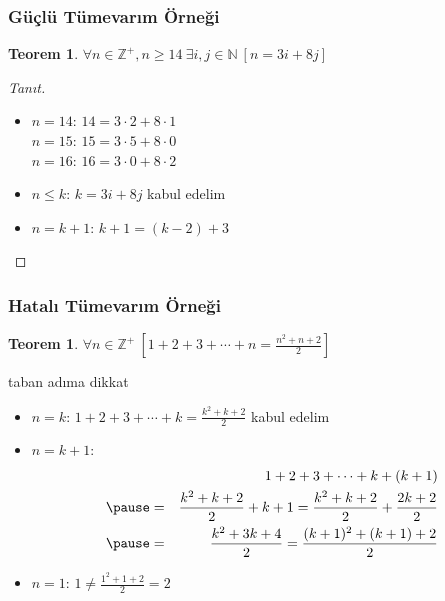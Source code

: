 \documentclass[dvipsnames]{beamer}
\theoremstyle{definition}
\theoremstyle{example}
\theoremstyle{plain}
\newtheorem{teorem}[theorem]{Teorem}
\begin{document}
\begin{frame}
  \frametitle{Güçlü Tümevarım Örneği}

  \begin{teorem}
    $\forall n \in \mathbb{Z}^+, n \geq 14~\exists i,j \in \mathbb{N}~[n=3i+8j]$
  \end{teorem}

  \pause
  \begin{proof}[Tanıt]
    \begin{itemize}
      \item $n=14$: $14=3 \cdot 2 + 8 \cdot 1$\\
        $n=15$: $15=3 \cdot 5 + 8 \cdot 0$\\
        $n=16$: $16=3 \cdot 0 + 8 \cdot 2$

      \pause
      \item $n \leq k$: $k=3i+8j$ kabul edelim

      \pause
      \item $n=k+1$: $k+1=(k-2)+3$
    \end{itemize}
  \end{proof}
\end{frame}

\begin{frame}
  \frametitle{Hatalı Tümevarım Örneği}

  \begin{teorem}
    $\forall n \in \mathbb{Z}^+~[1+2+3+\cdots+n=\frac{n^2+n+2}{2}]$
  \end{teorem}

  \pause
  \begin{block}{taban adıma dikkat}
    \begin{itemize}
      \item $n=k$: $1+2+3+\cdots+k=\frac{k^2+k+2}{2}$ kabul edelim

      \pause
      \item $n=k+1$:
      \begin{eqnarray*}
        &   & 1+2+3+\cdots+k+(k+1)\\\pause
        & = & \frac{k^2+k+2}{2}+k+1
          =   \frac{k^2+k+2}{2}+\frac{2k+2}{2}\\\pause
        & = & \frac{k^2+3k+4}{2}
          =   \frac{(k+1)^2+(k+1)+2}{2}
      \end{eqnarray*}

      \pause
      \item $n=1$: $1 \neq \frac{1^2+1+2}{2}=2$
    \end{itemize}
  \end{block}
\end{frame}
\end{document}
